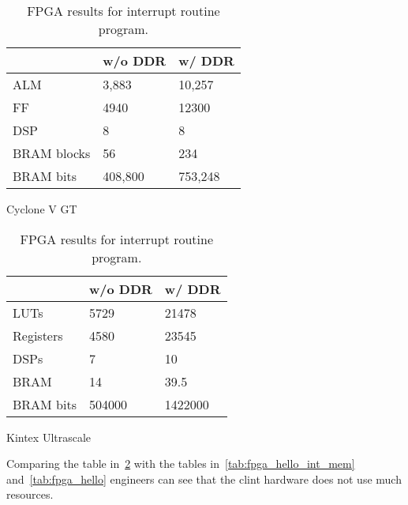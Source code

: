 \begin{table}[!ht]
    \begin{subtable}[h]{0.45\textwidth}
        \centering
        \begin{tabular}{l|l|l|}
            \cline{2-3}
                                              & w/o DDR & w/ DDR  \\ \hline
            \multicolumn{1}{|l|}{ALM}         & 3,883   & 10,257  \\ \hline
            \multicolumn{1}{|l|}{FF}          & 4940    & 12300   \\ \hline
            \multicolumn{1}{|l|}{DSP}         & 8       & 8       \\ \hline
            \multicolumn{1}{|l|}{BRAM blocks} & 56      & 234     \\ \hline
            \multicolumn{1}{|l|}{BRAM bits}   & 408,800 & 753,248 \\ \hline
        \end{tabular}
       \caption{Cyclone V GT}
       \label{tab:cyclone_int}
    \end{subtable}
    \hfill
    \begin{subtable}[h]{0.45\textwidth}
        \centering
        \begin{tabular}{l|l|l|}
            \cline{2-3}
                                            & w/o DDR & w/ DDR  \\ \hline
            \multicolumn{1}{|l|}{LUTs}      & 5729    & 21478   \\ \hline
            \multicolumn{1}{|l|}{Registers} & 4580    & 23545   \\ \hline
            \multicolumn{1}{|l|}{DSPs}      & 7       & 10      \\ \hline
            \multicolumn{1}{|l|}{BRAM}      & 14      & 39.5    \\ \hline
            \multicolumn{1}{|l|}{BRAM bits} & 504000  & 1422000 \\ \hline
        \end{tabular}
        \caption{Kintex Ultrascale}
        \label{tab:kintex_int}
     \end{subtable}
     \caption{FPGA results for interrupt routine program.}
     \label{tab:fpga_int}
\end{table}

Comparing the table in~\ref{tab:fpga_int} with the tables in~\ref{tab:fpga_hello_int_mem} and~\ref{tab:fpga_hello} engineers can see that the \acrshort{clint} hardware does not use much resources.

